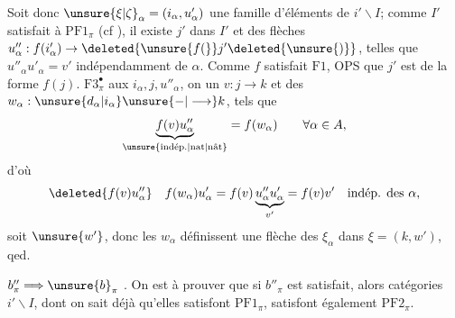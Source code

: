 Soit donc $\unsure{\xi|\zeta}_{\alpha}=(i_{\alpha},u'_{\alpha})$  une famille d'éléments de $i'\backslash I$;
comme $I'$ satisfait à $\mathrm{PF}1_{\pi}$ (cf ), il existe $j'$ dans $I'$ et des flèches $u''_{\alpha}:f(i'_{\alpha})\to\deleted{\unsure{f(}}j'\deleted{\unsure{)}}$, telles que $u''_{\alpha}u'_{\alpha}=v'$ indépendamment de $\alpha$.  Comme $f$ satisfait
$\mathrm{F}1$, OPS que $j'$ est de la forme $f(j)$.  $\mathrm{F}3^{\bullet}_{\pi}$ aux  $i_{\alpha},j,u''_{\alpha}$, on  un $v:j\longrightarrow k$ et des $w_{\alpha}:\unsure{d_{\alpha}|i_{\alpha}}\unsure{\mathbin{-}|\longrightarrow}k$, tels que
\[
 \underbrace{f(v)u''_{\alpha}}_{\unsure{\text{indép.}|\text{nat}|\text{nât}}}=f(w_{\alpha})\qquad\forall\alpha\in A,
\]
d'où
\[
 \deleted{f(v)u''_{\alpha}}\quad f(w_{\alpha})u'_{\alpha}
 = f(v)\underbrace{u''_{\alpha}u'_{\alpha}}_{v'}=f(v)v'\quad\text{indép. des }\alpha,
\]
soit $\unsure{w'}$, donc les $w_{\alpha}$ définissent une flèche des $\xi_{\alpha}$ dans $\xi=(k,w')$, qed.

$b''_{\pi}\Longrightarrow\unsure{b}_{\pi}$ . On est  à prouver que si $b''_{\pi}$ est satisfait,  alors   catégories $i'\backslash I$, dont on sait déjà qu'elles satisfont $\mathrm{PF}1_{\pi}$, satisfont également $\mathrm{PF}2_{\pi}$.

